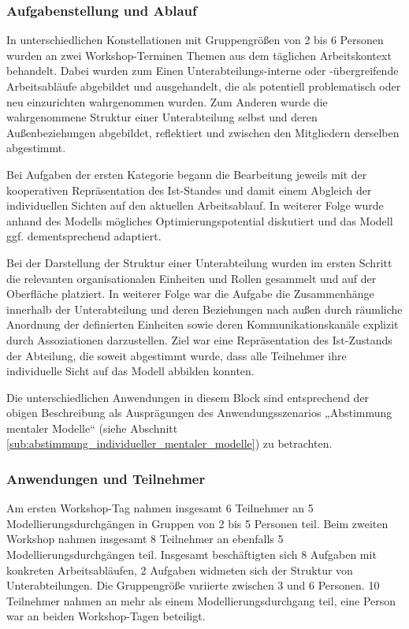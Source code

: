 
\subsubsection{Aufgabenstellung und Ablauf} %
\label{ssub:4_aufgabenstellung}

In unterschiedlichen Konstellationen mit Gruppengrößen von 2 bis 6 Personen wurden an zwei Workshop-Terminen Themen aus dem täglichen Arbeitskontext behandelt. Dabei wurden zum Einen Unterabteilungs-interne oder -übergreifende Arbeitsabläufe abgebildet und ausgehandelt, die als potentiell problematisch oder neu einzurichten wahrgenommen wurden. Zum Anderen wurde die wahrgenommene Struktur einer Unterabteilung selbst und deren Außenbeziehungen abgebildet, reflektiert und zwischen den Mitgliedern derselben abgestimmt.

Bei Aufgaben der ersten Kategorie begann die Bearbeitung jeweils mit der kooperativen Repräsentation des Ist-Standes und damit einem Abgleich der individuellen Sichten auf den aktuellen Arbeitsablauf. In weiterer Folge wurde anhand des Modells mögliches Optimierungspotential diskutiert und das Modell ggf. dementsprechend adaptiert.

Bei der Darstellung der Struktur einer Unterabteilung wurden im ersten Schritt die relevanten organisationalen Einheiten und Rollen gesammelt und auf der Oberfläche platziert. In weiterer Folge war die Aufgabe die Zusammenhänge innerhalb der Unterabteilung und deren Beziehungen nach außen durch räumliche Anordnung der definierten Einheiten sowie deren Kommunikationskanäle explizit durch Assoziationen darzustellen. Ziel war eine Repräsentation des Ist-Zustands der Abteilung, die soweit abgestimmt wurde, dass alle Teilnehmer ihre individuelle Sicht auf das Modell abbilden konnten.

Die unterschiedlichen Anwendungen in diesem Block sind entsprechend der obigen Beschreibung als Ausprägungen des Anwendungsszenarios „Abstimmung mentaler Modelle“ (siehe Abschnitt \ref{sub:abstimmung_individueller_mentaler_modelle}) zu betrachten.

\subsubsection{Anwendungen und Teilnehmer} %
\label{ssub:4_teilnehmer}

Am ersten Workshop-Tag nahmen insgesamt 6 Teilnehmer an 5 Modellierungsdurchgängen in Gruppen von 2 bis 5 Personen teil. Beim zweiten Workshop nahmen insgesamt 8 Teilnehmer an ebenfalls 5 Modellierungsdurchgängen teil. Insgesamt beschäftigten sich 8 Aufgaben mit konkreten Arbeitsabläufen, 2 Aufgaben widmeten sich der Struktur von Unterabteilungen. Die Gruppengröße variierte zwischen 3 und 6 Personen. 10 Teilnehmer nahmen an mehr als einem Modellierungsdurchgang teil, eine Person war an beiden Workshop-Tagen beteiligt.


